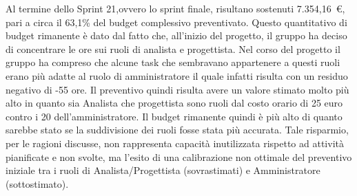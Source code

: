 Al termine dello Sprint 21,ovvero lo sprint finale, risultano sostenuti 7.354{,}16~\euro, pari a circa il 63,1\% del budget complessivo preventivato.
Questo quantitativo di budget rimanente è dato dal fatto che, all'inizio del progetto, il gruppo ha deciso di concentrare le ore sui 
ruoli di analista e progettista. Nel corso del progetto il gruppo ha compreso che alcune task che sembravano appartenere a questi ruoli erano 
più adatte al ruolo di amministratore il quale infatti risulta con un residuo negativo di -55 ore.
Il preventivo quindi risulta avere un valore stimato molto più alto in quanto sia Analista che progettista sono ruoli dal costo orario di 25 euro 
contro i 20 dell'amministratore. Il budget rimanente quindi è più alto di quanto sarebbe stato se la suddivisione dei ruoli fosse stata più accurata.
Tale risparmio, per le ragioni discusse, non rappresenta capacità
 inutilizzata rispetto ad attività pianificate e non svolte, ma l'esito di una calibrazione non ottimale del 
 preventivo iniziale tra i ruoli di Analista/Progettista (sovrastimati) e Amministratore (sottostimato).